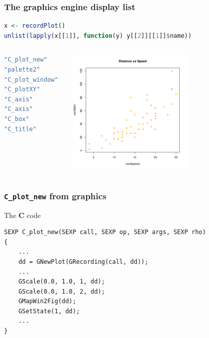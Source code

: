 \documentclass{beamer}
\begin{document}
\begin{frame}[fragile]
\frametitle{The graphics engine display list}


\begin{lstlisting}[language = R]
x <- recordPlot()
unlist(lapply(x[[1]], function(y) y[[2]][[1]]$name))
\end{lstlisting}

\begin{columns}[c]
\begin{lstlisting}[language = R]
"C_plot_new"    
"palette2"      
"C_plot_window" 
"C_plotXY"      
"C_axis"        
"C_axis"       
"C_box"         
"C_title"    
\end{lstlisting}


\includegraphics[height = 6cm, width = 6cm]{plot/intro_1.pdf}

\end{columns}

\end{frame}



\begin{frame}[fragile]
\frametitle{\texttt{C\_plot\_new} from \textbf{graphics}}

\begin{block}{The \textbf{C} code}
\begin{lstlisting}
SEXP C_plot_new(SEXP call, SEXP op, SEXP args, SEXP rho)
{
    ...
    dd = GNewPlot(GRecording(call, dd));
    ...
    GScale(0.0, 1.0, 1, dd);
    GScale(0.0, 1.0, 2, dd);
    GMapWin2Fig(dd);
    GSetState(1, dd);
    ...
}
\end{lstlisting}
\end{block}

\end{frame}
\end{document}
